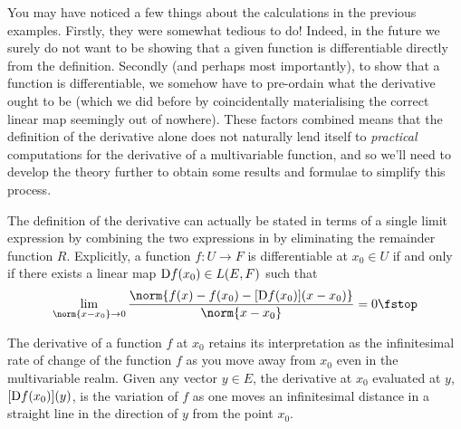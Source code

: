 You may have noticed a few things about the calculations in the previous examples. Firstly, they were somewhat tedious to do! Indeed, in the future we surely do not want to be showing that a given function is differentiable directly from the definition. Secondly (and perhaps most importantly), to show that a function is differentiable, we somehow have to pre-ordain what the derivative ought to be (which we did before by coincidentally materialising the correct linear map seemingly out of nowhere). These factors combined means that the definition of the derivative alone does not naturally lend itself to \emph{practical} computations for the derivative of a multivariable function, and so we'll need to develop the theory further to obtain some results and formulae to simplify this process.

\vspace{3mm}

The definition of the derivative can actually be stated in terms of a single limit expression by combining the two expressions in  by eliminating the remainder function \( R \). Explicitly, a function \( f:U\to F \) is differentiable at \( x_0\in U \) if and only if there exists a linear map \( \text{D} f(x_0)\in L(E,F) \) such that
\[ \lim_{\norm{x-x_0}\to 0}\frac{\norm{f(x)-f(x_0)-[\D f(x_0)](x-x_0)}}{\norm{x-x_0}}=0\fstop \]

The derivative of a function \( f \) at \( x_0 \) retains its interpretation as the infinitesimal rate of change of the function \( f \) as you move away from \( x_0 \) even in the multivariable realm. Given any vector \( y\in E \), the derivative at \( x_0 \) evaluated at \( y \), \( [\text{D} f(x_0)](y) \), is the variation of \( f \) as one moves an infinitesimal distance in a straight line in the direction of \( y \) from the point \( x_0 \).

